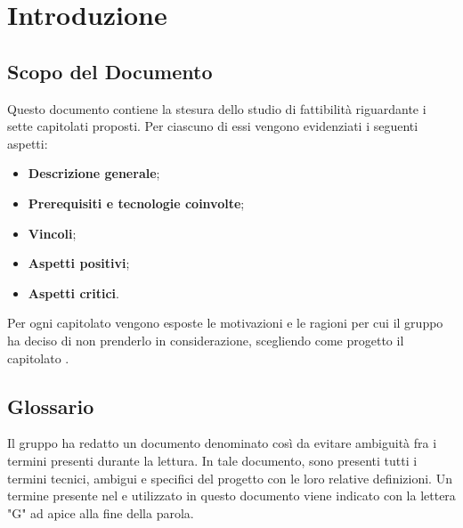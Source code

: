 \section{Introduzione}
\subsection{Scopo del Documento}
Questo documento contiene la stesura dello studio di fattibilità riguardante i sette capitolati proposti. Per ciascuno di essi vengono evidenziati i seguenti aspetti:
\begin{itemize}
    \item \textbf{Descrizione generale};
    \item \textbf{Prerequisiti e tecnologie coinvolte};
    \item \textbf{Vincoli};
    \item \textbf{Aspetti positivi};
    \item \textbf{Aspetti critici}.
\end{itemize}
Per ogni capitolato vengono esposte le motivazioni e le ragioni per cui il gruppo ha deciso di non prenderlo in considerazione, scegliendo come progetto il capitolato \NomeProgetto{}.
\subsection{Glossario}
Il gruppo \Gruppo{} ha redatto un documento denominato  così da evitare ambiguità fra i termini presenti durante la lettura.
In tale documento, sono presenti tutti i termini tecnici, ambigui e specifici del progetto con le loro relative definizioni.
Un termine presente nel  e utilizzato in questo documento viene indicato con la lettera "G" ad apice alla fine della parola.

